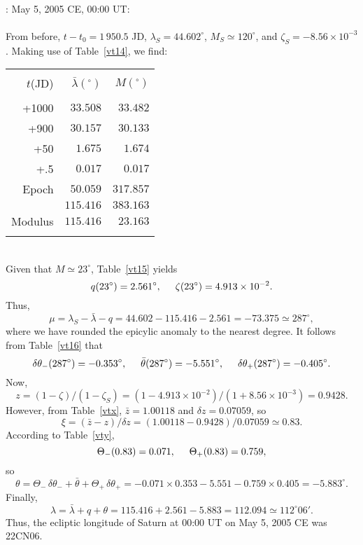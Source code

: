 ~\\
: May 5,  2005 CE, 00:00 UT:\\
~\\
From before, $t-t_0=1\,950.5$ JD, $\lambda_S= 44.602^\circ$, $M_S\simeq 120^\circ$, and
$\zeta_S= -8.56\times 10^{-3}$. Making use of
Table~\ref{vt14}, we find:\\
\begin{tabular}{rrr}
&&\\
$t$(JD) & $ \bar{\lambda}(^\circ)$ & $M(^\circ)$\\[-2ex]
&&\\
+1000 & $33.508$ & $33.482$\\
+900 & $30.157$ & $30.133$\\
+50 & $1.675$ & $1.674$\\
+.5 & $0.017$ & $0.017$\\
Epoch & $50.059$ & $317.857$\\\cline{2-3}
&$115.416$ & $383.163$\\\cline{2-3}
Modulus & $115.416$ & $23.163$\\ 
&&\\
\end{tabular}\\
Given that $M\simeq 23^\circ$, Table~\ref{vt15} yields 
$$
q(23^\circ)= 2.561^\circ,\mbox{\hspace{0.5cm}}\zeta(23^\circ)=4.913\times 10^{-2}.
$$
Thus, 
$$
\mu=\lambda_S - \bar{\lambda}-q = 44.602-115.416 -2.561= -73.375\simeq
287^\circ,
$$
where we have rounded the epicylic anomaly to the nearest degree. It follows from Table~\ref{vt16}
that 
$$
\delta\theta_-(287^\circ) = -0.353^\circ,\mbox{\hspace{0.5cm}}\bar{\theta}(287^\circ)=-5.551^\circ, \mbox{\hspace{0.5cm}}\delta\theta_+(287^\circ) = -0.405^\circ.
$$
Now,
$$ 
z= (1-\zeta)/(1-\zeta_S) = (1-4.913\times 10^{-2})/(1+8.56\times 10^{-3}) =
0.9428.
$$
However, from Table~\ref{vtx}, $\bar{z}= 1.00118$ and $\delta z = 0.07059$,
so
$$
\xi = (\bar{z}-z)/\delta z = (1.00118-0.9428)/0.07059 \simeq 0.83.
$$
According to Table~\ref{vty}, 
$$
\Theta_-(0.83) = 0.071, \mbox{\hspace{0.5cm}}\Theta_+(0.83) = 0.759,
$$
so
$$
\theta  = \Theta_-\,\delta\theta_- + \bar{\theta}+\Theta_+\,\delta\theta_+ = -0.071\times 0.353-5.551-0.759\times 0.405 =- 5.883^\circ.
$$ 
Finally,
$$
\lambda=\bar{\lambda} + q + \theta= 115.416+2.561-5.883=112.094 \simeq 112^\circ 06'.
$$
Thus,
the ecliptic longitude of Saturn at 00:00 UT on May 5, 2005 CE was 22CN06.

